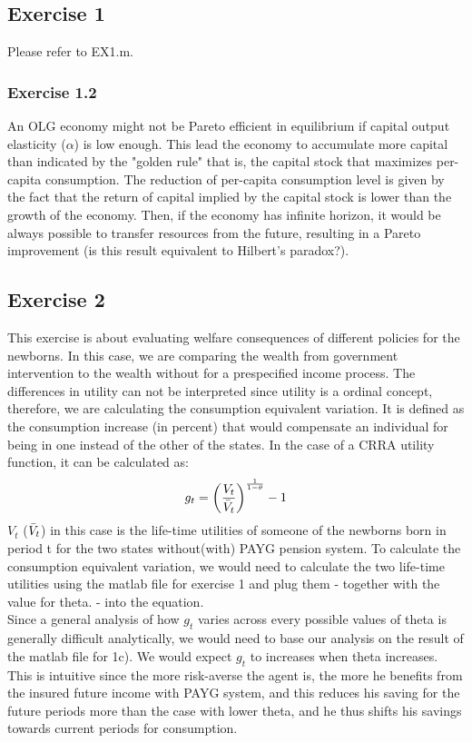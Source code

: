 \documentclass[12pt,a4paper,xcolor=dvipsnames]{article}
\begin{document}
\newpage
\subsection*{Exercise 1}
Please refer to EX1.m.

\subsubsection*{Exercise 1.2}
An OLG economy might not be Pareto efficient in equilibrium if capital output elasticity ($\alpha$) is low enough. This lead the economy to accumulate more capital than indicated by the "golden rule" that is, the capital stock that maximizes per-capita consumption. The reduction of per-capita consumption level is given by the fact that the return of capital implied by the capital stock is lower than the growth of the economy. Then, if the economy has infinite horizon, it would be always possible to transfer resources from the future, resulting in a Pareto improvement (is this result equivalent to Hilbert's paradox?).  

\subsection*{Exercise 2}
This exercise is about evaluating welfare consequences of different policies for the newborns. In this case, we are
comparing the wealth from government intervention to the wealth without for a prespecified income
process. The differences in utility can not be interpreted since utility is a ordinal concept, therefore,
we are calculating the consumption equivalent variation. It is defined as the consumption increase
(in percent) that would compensate an individual for being in one instead of the other of the states.
In the case of a CRRA utility function, it can be calculated as:
\begin{equation*}
    g_t=\bigg(\frac{V_t}{\Bar{V}_t}\bigg)^\frac{1}{1-\theta}-1
\end{equation*}
$V_t$ ($\Bar{V}_t$) in this case is the life-time utilities of someone of the newborns born in period t for the
two states without(with) PAYG pension system. To calculate the consumption equivalent variation, we would need to calculate the two life-time utilities using the matlab file for exercise 1 and plug them - together with the value for theta. 
- into the equation.\\
Since a general analysis of how $g_t$ varies across every possible values of theta is generally difficult analytically, we would need to base our analysis on the result of the matlab file for 1c).  
We would expect $g_t$ to increases when theta increases. This is intuitive since the more risk-averse the agent is, the more he benefits from the insured future income with PAYG system, and this reduces his saving for the future periods more than the case with lower theta, and he thus shifts his savings towards current periods for consumption.  
\end{document}
